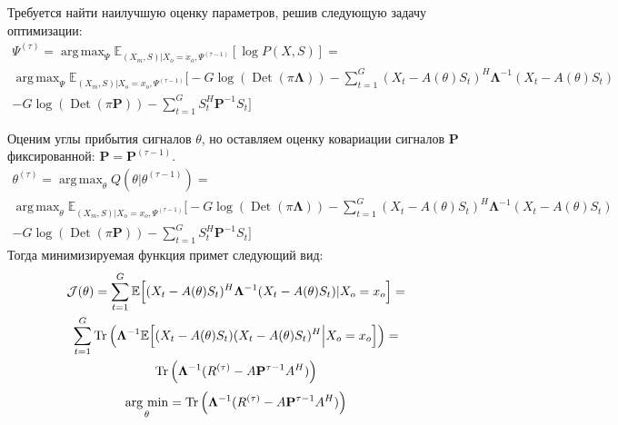 \documentclass[11pt]{article}
\newcommand{\Expect}{\mathbb{E}}
\DeclareMathOperator*{\argmax}{arg \, \max}
\DeclareMathOperator*{\argmin}{arg \, \min}
\DeclareMathOperator{\Det}{Det}
\begin{document}
\begin{center}
\fontsize{14}{18}\selectfont {}
\end{center}
Требуется найти наилучшую оценку параметров, решив следующую задачу оптимизации:
\begin{equation*}
\begin{gathered}
\Psi^{(\tau)}=\argmax_{\Psi} \Expect_{(X_m,S)|X_o=x_o, \Psi^{(\tau-1)}}[\log P(X, S)] = \\
\argmax_{\Psi} \Expect_{(X_m,S)|X_o=x_o, \Psi^{(\tau-1)}}\bigg[-G \log (\Det(\pi \mathbf{\Lambda})) - \sum_{t=1}^G (X_t-A(\theta)S_t)^H \mathbf{\Lambda}^{-1}(X_t-A(\theta)S_t) 
\\ - G \log(\Det(\pi \mathbf{P})) - \sum_{t=1}^G S_t^H \mathbf{P}^{-1}S_t\bigg]
\end{gathered}
\end{equation*}
\clearpage
\begin{center}
\fontsize{14}{18}\selectfont {}
\end{center}
Оценим углы прибытия сигналов $\theta$, но оставляем оценку ковариации сигналов $\mathbf{P}$ фиксированной: $\mathbf{P} = \mathbf{P}^{(\tau-1)}$.
\begin{equation*}
\begin{gathered}
\theta^{(\tau)}= \argmax_{\theta} Q(\theta | \theta^{(\tau-1)}) = \\
\argmax_{\theta} \Expect_{(X_m,S)|X_o=x_o, \Psi^{(\tau-1)}}\bigg[-G \log (\Det(\pi \mathbf{\Lambda})) - \sum_{t=1}^G (X_t-A(\theta)S_t)^H \mathbf{\Lambda}^{-1}(X_t-A(\theta)S_t) 
\\ - G \log(\Det(\pi \mathbf{P})) - \sum_{t=1}^G S_t^H \mathbf{P}^{-1}S_t\bigg]
\end{gathered}
\end{equation*}
Тогда минимизируемая функция примет следующий вид:
\begin{equation*}
\begin{gathered}
\mathcal{J}(\theta) = \sum_{t=1}^G \Expect \Big[ (X_t-A(\theta)S_t)^H\mathbf{\Lambda}^{-1}(X_t-A(\theta)S_t) \text{|}X_o = x_o\Big] = \\
\sum_{t=1}^G \Tr \Big( \mathbf{\Lambda}^{-1} \Expect \Big[ (X_t-A(\theta)S_t)(X_t-A(\theta)S_t)^H \Big{|}X_o = x_o \Big] \Big) = \\
\Tr \Big( \mathbf{\Lambda}^{-1} ({R}^{(\tau)} - A\mathbf{P}^{\tau-1}A^H) \Big)
\end{gathered}
\end{equation*}
\begin{equation}
\argmin_{\theta} = \Tr \Big( \mathbf{\Lambda}^{-1} ({R}^{(\tau)} - A\mathbf{P}^{\tau-1}A^H) \Big)
\end{equation}
\end{document}
